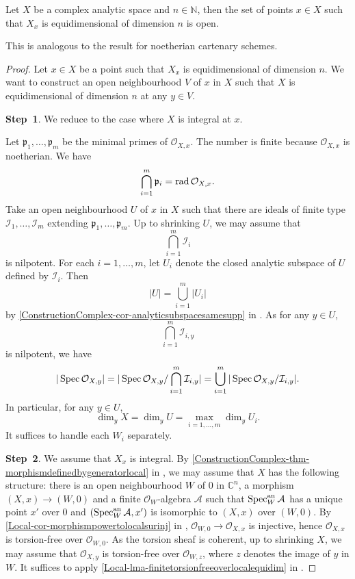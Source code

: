 \begin{thm}\label{thm-equidimlocusopen}
    Let $X$ be a complex analytic space and $n\in \mathbb{N}$, then the set of points $x\in X$ such that $X_x$ is equidimensional of dimension $n$ is open. 
\end{thm}
This is analogous to the result for noetherian cartenary schemes.
\begin{proof}
    Let $x\in X$ be a point such that $X_x$ is equidimensional of dimension $n$. 
    We want to construct an open neighbourhood $V$ of $x$ in $X$ such that $X$ is equidimensional of dimension $n$ at any $y\in V$.

    \textbf{Step~1}. We reduce to the case where $X$ is integral at $x$.

    Let $\mathfrak{p}_1,\ldots,\mathfrak{p}_m$ be the minimal primes of $\mathcal{O}_{X,x}$. The number is finite because $\mathcal{O}_{X,x}$ is noetherian. We have
    \[
        \bigcap_{i=1}^m \mathfrak{p}_i=\operatorname{rad} \mathcal{O}_{X,x}.
    \]
    Take an open neighbourhood $U$ of $x$ in $X$  such that there are ideals of finite type $\mathcal{I}_1,\ldots,\mathcal{I}_m$ extending $\mathfrak{p}_1,\ldots,\mathfrak{p}_m$.  Up to shrinking $U$, we may assume that 
    \[
        \bigcap_{i=1}^m \mathcal{I}_i  
    \]
    is nilpotent. For each $i=1,\ldots,m$, let $U_i$ denote the closed analytic subspace of $U$ defined by $\mathcal{I}_i$. Then
    \[
        |U|=\bigcup_{i=1}^m |U_i|  
    \]
    by \cref{ConstructionComplex-cor-analyticsubspacesamesupp} in . 
    As for any $y\in U$,
    \[
        \bigcap_{i=1}^m \mathcal{I}_{i,y} 
    \]
    is nilpotent, we have
    \[
        |\operatorname{Spec} \mathcal{O}_{X,y}|=|\operatorname{Spec} \mathcal{O}_{X,y}/\bigcap_{i=1}^m \mathcal{I}_{i,y} |=\bigcup_{i=1}^m |\operatorname{Spec} \mathcal{O}_{X,y}/\mathcal{I}_{i,y} |.
    \]
    In particular, for any $y\in U$, 
    \[
        \dim_y X=\dim_y U=\max_{i=1,\ldots,m} \dim_y U_i. 
    \]
    It suffices to handle each $W_i$ separately. 

    \textbf{Step~2}. We assume that $X_x$ is integral. By \cref{ConstructionComplex-thm-morphismdefinedbygeneratorlocal} in , we may assume that  $X$ has the following structure: there is an open neighbourhood $W$ of $0$ in $\mathbb{C}^n$, a morphism $(X,x)\rightarrow (W,0)$ and a finite $\mathcal{O}_W$-algebra $\mathcal{A}$ such that $\operatorname{Spec}^{\mathrm{an}}_W \mathcal{A}$ has a unique point $x'$ over $0$ and $(\operatorname{Spec}^{\mathrm{an}}_W \mathcal{A},x')$ is isomorphic to $(X,x)$ over $(W,0)$. By \cref{Local-cor-morphismpowertolocalsurinj} in , $\mathcal{O}_{W,0}\rightarrow \mathcal{O}_{X,x}$ is injective, hence $\mathcal{O}_{X,x}$ is torsion-free over $\mathcal{O}_{W,0}$. As the torsion sheaf is coherent, up to shrinking $X$, we may assume that $\mathcal{O}_{X,y}$ is torsion-free over $\mathcal{O}_{W,z}$, where $z$ denotes the image of $y$ in $W$. It suffices to apply \cref{Local-lma-finitetorsionfreeoverlocalequidim} in .
\end{proof}

